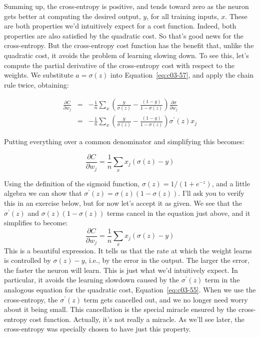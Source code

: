 Summing up, the cross-entropy is positive, and tends toward zero as the neuron gets better at computing the desired output, $y$, for all training inputs, $x$. These are both properties we'd intuitively expect for a cost function. Indeed, both properties are also satisfied by the quadratic cost. So that's good news for the cross-entropy. But the cross-entropy cost function has the benefit that, unlike the quadratic cost, it avoids the problem of learning slowing down. To see this, let's compute the partial derivative of the cross-entropy cost with respect to the weights. We substitute $a=\sigma(z)$ into Equation~\ref{eq:c03-57}, and apply the chain rule twice, obtaining: 

\begin{eqnarray}
\frac{\partial C}{\partial w_{j}} 
&=&-\frac{1}{n} \sum_{x}\left(\frac{y}{\sigma(z)}-\frac{(1-y)}{1-\sigma(z)}\right) \frac{\partial \sigma}{\partial w_{j}} \label{eq:c03-58}\\ 
&=&-\frac{1}{n} \sum_{x}\left(\frac{y}{\sigma(z)}-\frac{(1-y)}{1-\sigma(z)}\right) \sigma^{\prime}(z) x_{j} \label{eq:c03-59}
\end{eqnarray}

Putting everything over a common denominator and simplifying this becomes: 

\begin{equation}
\frac{\partial C}{\partial w_{j}}=\frac{1}{n} \sum_{x} x_{j}(\sigma(z)-y)
\label{eq:c03-60}
\end{equation}



Using the definition of the sigmoid function, $\sigma(z)=1 /\left(1+e^{-z}\right)$,  and a little algebra we can show that $\sigma^{\prime}(z)=\sigma(z)(1-\sigma(z))$. I'll ask you to verify this in an exercise below, but for now let's accept it as given. We see that the $\sigma^{\prime}(z)$ and $\sigma(z)(1-\sigma(z))$ terms cancel in the equation just above, and it simplifies to become: 
\begin{equation}
\frac{\partial C}{\partial w_{j}}=\frac{1}{n} \sum_{x} x_{j}(\sigma(z)-y)
\label{eq:c03-61}
\end{equation}
This is a beautiful expression. It tells us that the rate at which the weight learns is controlled by $\sigma(z)-y$, i.e., by the error in the output. The larger the error, the faster the neuron will learn. This is just what we'd intuitively expect. In particular, it avoids the learning slowdown caused by the $\sigma^{\prime}(z)$ term in the analogous equation for the quadratic cost, Equation~\ref{eq:c03-55}. When we use the cross-entropy, the $\sigma^{\prime}(z)$ term gets cancelled out, and we no longer need worry about it being small. This cancellation is the special miracle ensured by the cross-entropy cost function. Actually, it's not really a miracle. As we'll see later, the cross-entropy was specially chosen to have just this property.

